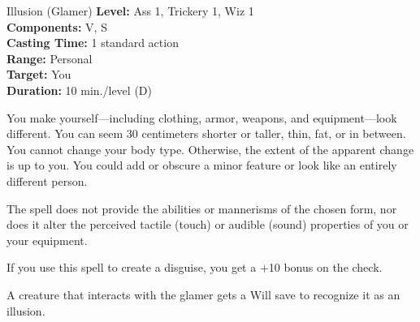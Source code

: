 {Illusion (Glamer)}
{
	\textbf{Level:}
	Ass 1, Trickery 1, Wiz 1\\
	\textbf{Components:}
	V, S\\
	\textbf{Casting Time:}
	1 standard action\\
	\textbf{Range:}
	Personal\\
	\textbf{Target:}
	You\\
	\textbf{Duration:}
	10 min./level (D)\\
}
{
	You make yourself---including clothing, armor, weapons, and equipment---look different. You can seem 30 centimeters shorter or taller, thin, fat, or in between. You cannot change your body type. Otherwise, the extent of the apparent change is up to you. You could add or obscure a minor feature or look like an entirely different person.

	The spell does not provide the abilities or mannerisms of the chosen form, nor does it alter the perceived tactile (touch) or audible (sound) properties of you or your equipment.

	If you use this spell to create a disguise, you get a +10 bonus on the  check.

	A creature that interacts with the glamer gets a Will save to recognize it as an illusion.

}
